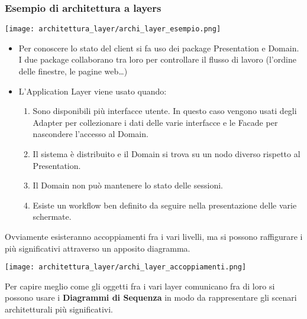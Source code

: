 {    \subsubsection{Esempio di architettura a layers}
    \begin{center}
        \texttt{[image: architettura\_layer/archi\_layer\_esempio.png]}
    \end{center}
    \begin{itemize}
        \item Per conoscere lo stato del client si fa uso dei package Presentation e Domain. I due package collaborano tra loro
              per controllare il flusso di lavoro (l'ordine delle finestre, le pagine web\dots)
        \item L'Application Layer viene usato quando:
              \begin{enumerate}
                  \item Sono disponibili più interfacce utente. In questo caso vengono usati degli Adapter per collezionare i dati delle varie
                        interfacce e le Facade per nascondere l'accesso al Domain.
                  \item Il sistema è distribuito e il Domain si trova su un nodo diverso rispetto al Presentation.
                  \item Il Domain non può mantenere lo stato delle sessioni.
                  \item Esiste un workflow ben definito da seguire nella presentazione delle varie schermate.
              \end{enumerate}
    \end{itemize}
    \newpage
    \noindent Ovviamente esisteranno accoppiamenti fra i vari livelli, ma si possono raffigurare i più significativi
    attraverso un apposito diagramma.
    \begin{center}
        \texttt{[image: architettura\_layer/archi\_layer\_accoppiamenti.png]}
    \end{center}
    Per capire meglio come gli oggetti fra i vari layer comunicano fra di loro si possono usare i \textbf{Diagrammi di Sequenza} in
    modo da rappresentare gli scenari architetturali più significativi.
}
